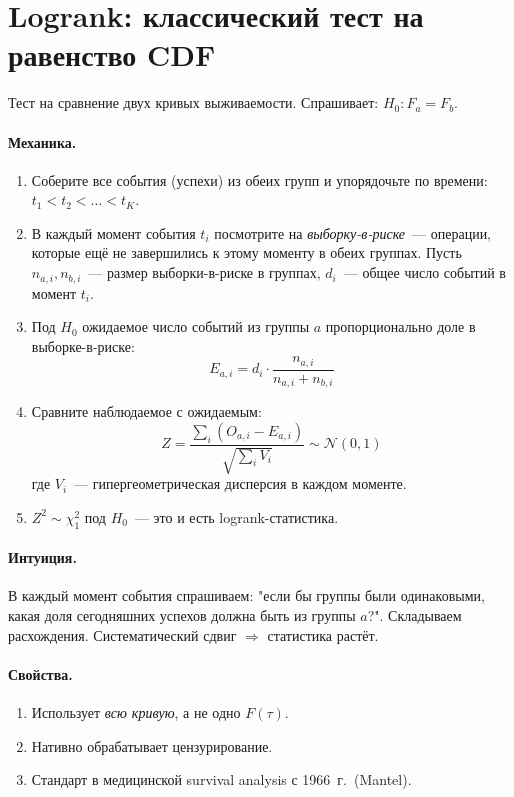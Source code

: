 \documentclass[11pt]{article}
\begin{document}
\section{Logrank: классический тест на равенство CDF}\label{sec:logrank}

Тест на сравнение двух кривых выживаемости. Спрашивает: $H_0: F_a = F_b$.

\paragraph{Механика.}
\begin{enumerate}[leftmargin=2em, itemsep=1pt]
\item Соберите все события (успехи) из обеих групп и упорядочьте по времени: $t_1 < t_2 < \dots < t_K$.

\item В каждый момент события $t_i$ посмотрите на \emph{выборку-в-риске}~--- операции, которые ещё не завершились к этому моменту в обеих группах. Пусть $n_{a,i}, n_{b,i}$~--- размер выборки-в-риске в группах, $d_i$~--- общее число событий в момент $t_i$.

\item Под $H_0$ ожидаемое число событий из группы $a$ пропорционально доле в выборке-в-риске:
\[
E_{a,i} = d_i \cdot \frac{n_{a,i}}{n_{a,i} + n_{b,i}}
\]

\item Сравните наблюдаемое с ожидаемым:
\[
Z = \frac{\sum_i (O_{a,i} - E_{a,i})}{\sqrt{\sum_i V_i}} \sim \mathcal{N}(0, 1)
\]
где $V_i$~--- гипергеометрическая дисперсия в каждом моменте.

\item $Z^2 \sim \chi^2_1$ под $H_0$~--- это и есть logrank-статистика.
\end{enumerate}

\paragraph{Интуиция.} В каждый момент события спрашиваем: "если бы группы были одинаковыми, какая доля сегодняшних успехов должна быть из группы $a$?". Складываем расхождения. Систематический сдвиг $\Rightarrow$ статистика растёт.

\paragraph{Свойства.}
\begin{enumerate}[leftmargin=2em, itemsep=1pt]
\item Использует \emph{всю кривую}, а не одно $F(\tau)$.
\item Нативно обрабатывает цензурирование.
\item Стандарт в медицинской survival analysis с 1966~г.\ (Mantel).
\end{enumerate}
\end{document}

